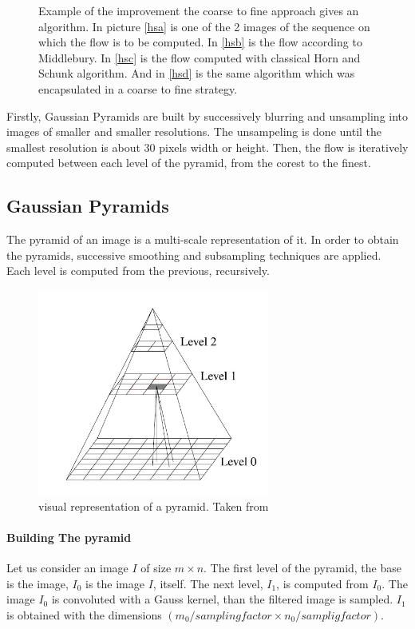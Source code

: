 \documentclass[12pt,a4paper,twoside]{report}
\begin{document}
{\begin{figure}
	\caption{Example of the improvement the coarse to fine approach gives an algorithm. In picture \ref{hsa} is one of the 2 images of the sequence on which the flow is to be computed. In \ref{hsb} is the flow according to Middlebury. In \ref{hsc} is the flow computed with classical Horn and Schunk algorithm. And in \ref{hsd} is the same algorithm which was encapsulated in a coarse to fine strategy.}
\end{figure}

 
Firstly, Gaussian Pyramids are built by successively blurring and unsampling into images of smaller and smaller resolutions. The unsampeling is done until the smallest resolution is about 30 pixels width or height.  Then, the flow is iteratively computed between each level of the pyramid, from the corest to the finest.
\subsection{Gaussian Pyramids}
The pyramid of an image is a multi-scale representation of it. In order to obtain the pyramids, successive smoothing and subsampling techniques are applied.  Each level is computed from the previous, recursively.

\begin{figure}
	\label{PyrGr}
	\centering
	\includegraphics[width = 3in]{img/pyrLvls}
	\caption{visual representation of a pyramid. Taken from \cite{wedel2011stereo}}
\end{figure}



\paragraph{Building The pyramid} 
 Let us consider an image $I$ of size $m \times n$. The first level of the pyramid, the base is the image, $I_0$ is the image $I$, itself. The next level, $I_1$, is computed from $I_0$. The image $I_0$ is convoluted with a Gauss kernel, than the filtered image is sampled. $I_1$ is obtained with the dimensions $(m_0/sampling factor \times n_0/samplig factor)$. 

}
\end{document}

